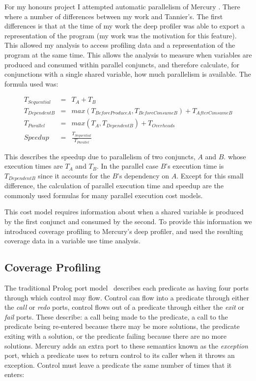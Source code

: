 For my honours project I attempted automatic parallelism of Mercury
\citep{paul_hons}.
There where a number of differences between my work and Tannier's.
The first differences is that at the time of my work the deep profiler
was able to export a representation of the program
(my work was the motivation for this feature).
This allowed my analysis to access profiling data and a representation
of the program at the same time.
This allows the analysis to measure when variables are produced and
consumed within parallel conjuncts,
and therefore calculate,
for conjunctions with a single shared variable,
how much parallelism is available.
The formula used was:

\begin{eqnarray*}
T_{Sequential} & = & T_A + T_B \\
T_{DependentB} & = & max(T_{BeforeProduceA}, T_{BeforeConsumeB}) +
T_{AfterConsumeB} \\
T_{Parallel} & = & max(T_A, T_{DependentB}) + T_{Overheads} \\
Speedup & = & \frac{T_{Sequential}}{T_{Parallel}}
\end{eqnarray*}

This describes the speedup due to parallelism of two conjuncts, $A$ and $B$.
whose execution times are $T_A$ and $T_B$.
In the parallel case $B$'s execution time is $T_{DependentB}$ since it
accounts for the $B$'s dependency on $A$.
Except for this small difference,
the calculation of parallel execution time and speedup are the commonly
used formulas for many parallel execution cost models.

This cost model requires information about when a shared variable is
produced by the first conjunct and consumed by the second.
To provide this information we introduced coverage profiling to
Mercury's deep profiler,
and used the resulting coverage data in a variable use time analysis.

\subsection{Coverage Profiling}
\label{sec:coverage}

The traditional Prolog port model~\cite{port_model} describes each predicate as
having four ports through which control may flow.
Control can flow into a predicate through either the \emph{call} or
\emph{redo} ports,
control flows out of a predicate through either the \emph{exit} or
\emph{fail} ports.
These describe:
    a call being made to the predicate,
    a call to the predicate being re-entered because there may be more
    solutions,
    the predicate exiting with a solution,
    or the predicate failing because there are no more solutions.
Mercury adds an extra port to these semantics known as the
\emph{exception} port,
which a predicate uses to return control to its caller when it throws an
exception.
Control must leave a predicate the same number of times that it enters:

